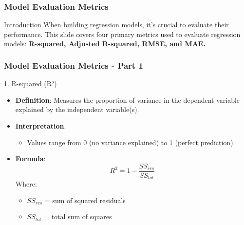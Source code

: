 \documentclass{beamer}
\begin{document}
\begin{frame}[fragile]
    \frametitle{Model Evaluation Metrics}
    \begin{block}{Introduction}
        When building regression models, it's crucial to evaluate their performance. 
        This slide covers four primary metrics used to evaluate regression models:
        \textbf{R-squared, Adjusted R-squared, RMSE, and MAE.}
    \end{block}
\end{frame}

\begin{frame}[fragile]
    \frametitle{Model Evaluation Metrics - Part 1}
    \begin{block}{1. R-squared (R²)}
        \begin{itemize}
            \item \textbf{Definition}: Measures the proportion of variance in the dependent variable explained by the independent variable(s).
            \item \textbf{Interpretation}:
                \begin{itemize}
                    \item Values range from 0 (no variance explained) to 1 (perfect prediction).
                \end{itemize}
            \item \textbf{Formula}:
            \begin{equation}
                R^2 = 1 - \frac{SS_{res}}{SS_{tot}}
            \end{equation}
            Where:
            \begin{itemize}
                \item \( SS_{res} \) = sum of squared residuals
                \item \( SS_{tot} \) = total sum of squares
            \end{itemize}
        \end{itemize}
    \end{block}
\end{frame}
\end{document}
